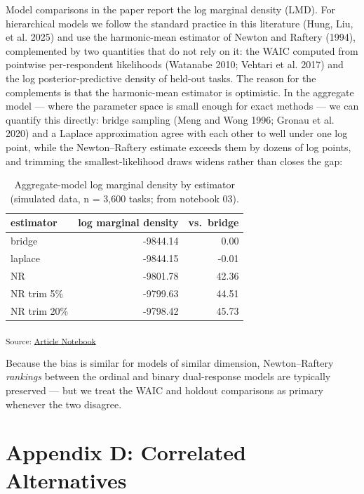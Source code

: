 \documentclass[
  letterpaper,
  DIV=11,
  numbers=noendperiod]{scrartcl}
\theoremstyle{plain}
\theoremstyle{plain}
\theoremstyle{remark}
\begin{document}
Model comparisons in the paper report the log marginal density (LMD).
For hierarchical models we follow the standard practice in this
literature (Hung, Liu, et al. 2025) and use the harmonic-mean estimator
of Newton and Raftery (1994), complemented by two quantities that do not
rely on it: the WAIC computed from pointwise per-respondent likelihoods
(Watanabe 2010; Vehtari et al. 2017) and the log posterior-predictive
density of held-out tasks. The reason for the complements is that the
harmonic-mean estimator is optimistic. In the aggregate model --- where
the parameter space is small enough for exact methods --- we can
quantify this directly: bridge sampling (Meng and Wong 1996; Gronau et
al. 2020) and a Laplace approximation agree with each other to well
under one log point, while the Newton--Raftery estimate exceeds them by
dozens of log points, and trimming the smallest-likelihood draws widens
rather than closes the gap:

\begin{longtable}[]{@{}lrr@{}}

\caption{\label{tbl-lmd-check}Aggregate-model log marginal density by
estimator (simulated data, n = 3,600 tasks; from notebook 03).}

\tabularnewline

\toprule\noalign{}
estimator & log marginal density & vs.~bridge \\
\midrule\noalign{}
\endhead
\bottomrule\noalign{}
\endlastfoot
bridge & -9844.14 & 0.00 \\
laplace & -9844.15 & -0.01 \\
NR & -9801.78 & 42.36 \\
NR trim 5\% & -9799.63 & 44.51 \\
NR trim 20\% & -9798.42 & 45.73 \\

\end{longtable}

\textsubscript{Source:
\href{https://dyavorsky.github.io/ordinalDualresponse_paper/index.qmd.html}{Article
Notebook}}

Because the bias is similar for models of similar dimension,
Newton--Raftery \emph{rankings} between the ordinal and binary
dual-response models are typically preserved --- but we treat the WAIC
and holdout comparisons as primary whenever the two disagree.

\section*{Appendix D: Correlated Alternatives}\label{sec-appendix-gev}
\end{document}
